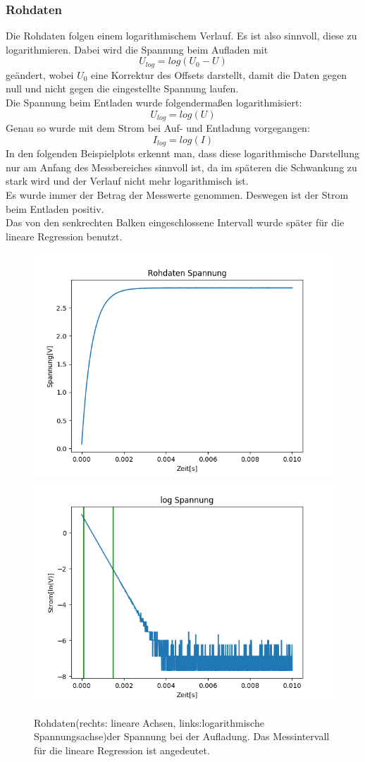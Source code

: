 \documentclass[12pt,a4paper]{article}
\begin{document}
\subsubsection{Rohdaten}
Die Rohdaten folgen einem logarithmischem Verlauf. Es ist also sinnvoll, diese zu logarithmieren. Dabei wird die Spannung beim Aufladen mit
\begin{equation}
U_{log} = log(U_0-U)
\end{equation}
geändert, wobei $U_0$ eine Korrektur des Offsets darstellt, damit die Daten gegen null und nicht gegen die eingestellte Spannung laufen.\\
Die Spannung beim Entladen wurde folgendermaßen logarithmisiert:
\begin{equation}
U_{log} = log(U)
\end{equation}
Genau so wurde mit dem Strom bei Auf- und Entladung vorgegangen:
\begin{equation}
I_{log} = log(I)
\end{equation}
In den folgenden Beispielplots erkennt man, dass diese logarithmische Darstellung nur am Anfang des Messbereiches sinnvoll ist, da im späteren die Schwankung zu stark wird und der Verlauf nicht mehr logarithmisch ist.\\
Es wurde immer der Betrag der Messwerte genommen. Deswegen ist der Strom beim Entladen positiv.\\
Das von den senkrechten Balken eingeschlossene Intervall wurde später für die lineare Regression benutzt.
\begin{figure}[H]
\begin{center}
\includegraphics[width=0.49\linewidth]{Bilder/Kondensator_U}
\includegraphics[width=0.49\linewidth]{Bilder/Kondensator_logU}
\caption[Rohdaten logarith. A]{Rohdaten(rechts: lineare Achsen, links:logarithmische Spannungsachse)der Spannung bei der Aufladung. Das Messintervall für die lineare Regression ist angedeutet.}
\label{fig:RohU}
\end{center}
\end{figure}
\end{document}
